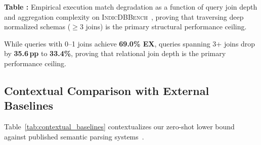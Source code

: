\documentclass[conference]{IEEEtran}
\begin{document}
\begin{table}[htbp]
\centering
\renewcommand{\arraystretch}{1.25}
\vspace{6pt}
\label{tab:complexity_breakdown}
\begin{flushleft}
\small\textbf{Table \thetable:} Empirical execution match degradation as a function of query join depth and aggregation complexity on \textsc{IndicDBBench}~\cite{dawar2026indicdbbench}, proving that traversing deep normalized schemas ($\ge 3$ joins) is the primary structural performance ceiling.
\end{flushleft}
\end{table}

While queries with 0--1 joins achieve \textbf{69.0\% EX}, queries spanning 3+ joins drop by \textbf{35.6\,pp} to \textbf{33.4\%}, proving that relational join depth is the primary performance ceiling.

\subsection{Contextual Comparison with External Baselines}
Table~\ref{tab:contextual_baselines} contextualizes our zero-shot lower bound against published semantic parsing systems~\cite{herzig2020tapas, shi2022mt5, gao2023gpt4}.
\end{document}
